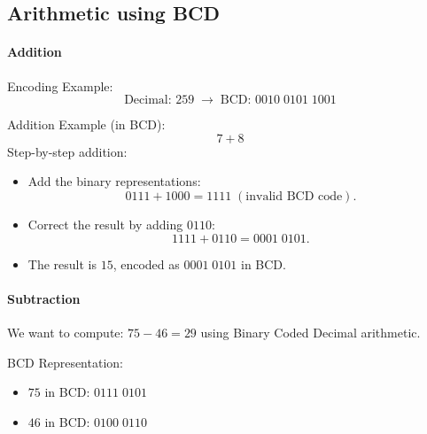 \subsection{Arithmetic using BCD}
\paragraph{Addition}
Encoding Example:
\[
\text{Decimal: } 259 \; \rightarrow \; \text{BCD: } 0010 \; 0101 \; 1001
\]

 Addition Example (in BCD):
\[
7 + 8
\]
Step-by-step addition:
\begin{itemize}
    \item Add the binary representations:
    \[
    0111 + 1000 = 1111 \; (\text{invalid BCD code}).
    \]
    \item Correct the result by adding \( 0110 \):
    \[
    1111 + 0110 = 0001 \; 0101.
    \]
    \item The result is \( 15 \), encoded as \( 0001 \; 0101 \) in BCD.
\end{itemize}

\paragraph{Subtraction}
We want to compute:
\(
75 - 46 = 29
\)
using Binary Coded Decimal arithmetic.

\vspace{\baselineskip}\par
BCD Representation:
\begin{itemize}[noitemsep, left=1cm]
    \item \( 75 \) in BCD:
    \(
    0111 \; 0101
    \)
    \item \( 46 \) in BCD:
    \(
    0100 \; 0110
    \)
\end{itemize}

